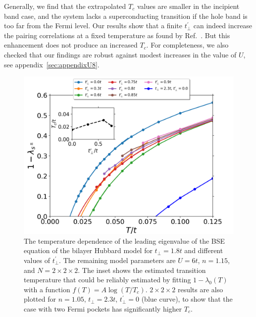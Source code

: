 \documentclass[prb,twocolumn,amsmath,amssymb,superscriptaddress,floatfix,nofootinbib]{revtex4-2}
\begin{document}

Generally, we find that the extrapolated $T_c$ values are smaller in the incipient band case, and the system lacks a superconducting transition if the hole band is too far from the Fermi level. Our results show that a finite $t_\perp^{\prime}$ can indeed increase the pairing correlations at a fixed temperature as found by Ref.~. But this enhancement does not produce an increased $T_c$. For completeness, we also checked that our findings are robust against modest increases in the value of $U$, see appendix~\ref{sec:appendixU8}.

\begin{figure}
\centering
\includegraphics[scale=0.4]{2x2_L0_n0pt85_U6_varyT.png}
\caption{The temperature dependence of the leading eigenvalue of the BSE equation of the bilayer Hubbard model for  $t_{\perp}=1.8t$ and different values of $t_{\perp}^{\prime}$. The remaining model parameters are $U=6t$, $n=1.15$, and $N = 2\times 2 \times 2$. The inset shows the estimated transition temperature that could be reliably estimated by 
fitting $1-\lambda_0(T)$ with a function $f(T) = A\log(T/T_c)$. $2\times2\times2$ results are also plotted for $n=1.05$, $t_\perp=2.3t$, $t_\perp^\prime=0$ (blue curve), to show that the case with two Fermi pockets has significantly higher $T_c$.}
\label{fig:lambdatperpprime2}
\end{figure}
\end{document}
